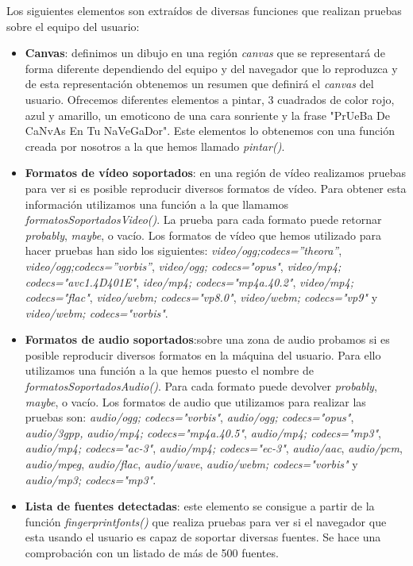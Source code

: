 \noindent  Los siguientes elementos son extraídos de diversas funciones que realizan pruebas sobre el equipo del usuario:
\begin{itemize} 
    \item \textbf{Canvas}: definimos un dibujo en una región \textit{canvas} que se representará de forma diferente dependiendo del equipo y del navegador que lo reproduzca y de esta representación obtenemos un resumen que definirá el \textit{canvas} del usuario. Ofrecemos diferentes elementos a pintar, 3 cuadrados de color rojo, azul y amarillo, un emoticono de una cara sonriente y la frase "PrUeBa De CaNvAs En Tu NaVeGaDor". Este elementos lo obtenemos con una función creada por nosotros a la que hemos llamado \textit{pintar()}.
    \item \textbf{Formatos de vídeo soportados}: en una región de vídeo realizamos pruebas para ver si es posible reproducir diversos formatos de vídeo. Para obtener esta información utilizamos una función a la que llamamos \textit{formatosSoportadosVideo()}. La prueba para cada formato puede retornar \textit{probably}, \textit{maybe}, o vacío. Los formatos de vídeo que hemos utilizado para hacer pruebas han sido los siguientes: \textit{video/ogg;codecs=”theora”}, \textit{video/ogg;codecs=”vorbis”}, \textit{video/ogg; codecs="opus"}, \textit{video/mp4; codecs="avc1.4D401E"}, \textit{ideo/mp4; codecs="mp4a.40.2"}, \textit{video/mp4; codecs="flac"}, \textit{video/webm; codecs="vp8.0"}, \textit{video/webm; codecs="vp9"} y \textit{video/webm; codecs="vorbis"}. 
    \item \textbf{Formatos de audio soportados}:sobre una zona de audio probamos si es posible reproducir diversos formatos en la máquina del usuario. Para ello utilizamos una función a la que hemos puesto el nombre de \textit{formatosSoportadosAudio()}. Para cada formato puede devolver \textit{probably}, \textit{maybe}, o vacío. Los formatos de audio que utilizamos para realizar las pruebas son: \textit{audio/ogg; codecs="vorbis"}, \textit{audio/ogg; codecs="opus"}, \textit{audio/3gpp, audio/mp4; codecs="mp4a.40.5"}, \textit{audio/mp4; codecs="mp3"}, \textit{audio/mp4; codecs="ac-3"}, \textit{audio/mp4; codecs="ec-3"}, \textit{audio/aac}, \textit{audio/pcm}, \textit{audio/mpeg}, \textit{audio/flac}, \textit{audio/wave}, \textit{audio/webm; codecs="vorbis"} y \textit{audio/mp3; codecs="mp3"}.
    \item \textbf{Lista de fuentes detectadas}: este elemento se consigue a partir de la función \textit{fingerprintfonts()} que realiza pruebas para ver si el navegador que esta usando el usuario es capaz de soportar diversas fuentes. Se hace una comprobación con un listado de más de 500 fuentes.
\end{itemize}
